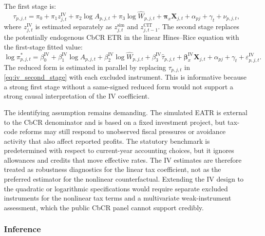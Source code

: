 \documentclass[11pt,a4paper]{article}
\begin{document}
The first stage is:
\begin{equation}\label{eq:iv_first_stage}
\tau_{p,j,t} = \pi_0 + \pi_1 z_{j,t}^{\text{IV}} + \pi_2 \log A_{p,j,t} + \pi_3 \log \hat{W}_{p,j,t} + \mathbf{\pi}_x \mathbf{X}_{j,t} + \alpha_{pj} + \gamma_t + \nu_{p,j,t},
\end{equation}
where $z_{j,t}^{\text{IV}}$ is estimated separately as $z_{j,t}^{\text{sim}}$ and $z_{j,t-1}^{\text{CIT}}$.
The second stage replaces the potentially endogenous CbCR ETR in the linear Hines--Rice equation with the first-stage fitted value:
\begin{equation}\label{eq:iv_second_stage}
\log \pi_{p,j,t}^{*} = \beta_0^{\text{IV}} + \beta_1^{\text{IV}} \log A_{p,j,t} + \beta_2^{\text{IV}} \log \hat{W}_{p,j,t} + \beta_3^{\text{IV}} \widehat{\tau}_{p,j,t} + \mathbf{\beta}_x^{\text{IV}} \mathbf{X}_{j,t} + \alpha_{pj} + \gamma_t + \varepsilon_{p,j,t}^{\text{IV}}.
\end{equation}
The reduced form is estimated in parallel by replacing $\tau_{p,j,t}$ in \eqref{eq:iv_second_stage} with each excluded instrument. This is informative because a strong first stage without a same-signed reduced form would not support a strong causal interpretation of the IV coefficient.

The identifying assumption remains demanding. The simulated EATR is external to the CbCR denominator and is based on a fixed investment project, but tax-code reforms may still respond to unobserved fiscal pressures or avoidance activity that also affect reported profits. The statutory benchmark is predetermined with respect to current-year accounting choices, but it ignores allowances and credits that move effective rates. The IV estimates are therefore treated as robustness diagnostics for the linear tax coefficient, not as the preferred estimator for the nonlinear counterfactual. Extending the IV design to the quadratic or logarithmic specifications would require separate excluded instruments for the nonlinear tax terms and a multivariate weak-instrument assessment, which the public CbCR panel cannot support credibly.

\subsubsection{Inference}\label{sec:inference}
\end{document}
